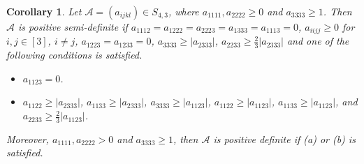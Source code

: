 \documentclass[twoside]{article}
\newtheorem{corollary}{Corollary}[section]
\begin{document}


\begin{corollary}\label{cor3}
Let ${\mathcal{A}}=(a_{ijkl})\in S_{4,3}$, where $a_{1111},a_{2222}\geq0$ and $a_{3333}\geq1$. Then $\mathcal{A}$ is positive semi-definite if $a_{1112}=a_{1222}=a_{2223}=a_{1333}=a_{1113}=0$, $a_{iijj}\geq0$ for $i,j\in[3]$, $i\neq j$, $a_{1223}=a_{1233}=0$, $a_{3333}\geq |a_{2333}|$, $a_{2233}\geq \frac{2}{3}|a_{2333}|$ and one of the following conditions is satisfied.
\begin{itemize}
  \item [(a)] $a_{1123}=0$.
  \item [(b)] $a_{1122}\geq |a_{2333}|$, $a_{1133}\geq |a_{2333}|$, $a_{3333}\geq |a_{1123}|$, $a_{1122}\geq |a_{1123}|$, $a_{1133}\geq |a_{1123}|$, and $a_{2233}\geq \frac{2}{3}|a_{1123}|$.
\end{itemize}
 Moreover, $a_{1111},a_{2222}>0$ and $a_{3333}\geq1$, then $\mathcal{A}$ is positive definite if (a) or (b) is satisfied.
\end{corollary}
\end{document}
